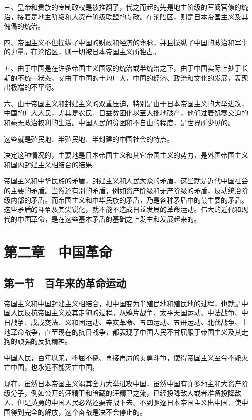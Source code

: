 三、皇帝和贵族的专制政权是被推翻了，代之而起的先是地主阶级的军阀官僚的统治，接着是地主阶级和大资产阶级联盟的专政。在沦陷区，则是日本帝国主义及其傀儡的统治。

四、帝国主义不但操纵了中国的财政和经济的命脉，并且操纵了中国的政治和军事的力量。在沦陷区，则一切被日本帝国主义所独占。

五、由于中国是在许多帝国主义国家的统治或半统治之下，由于中国实际上处于长期的不统一状态，又由于中国的土地广大，中国的经济、政治和文化的发展，表现出极端的不平衡。

六、由于帝国主义和封建主义的双重压迫，特别是由于日本帝国主义的大举进攻，中国的广大人民，尤其是农民，日益贫困化以至大批地破产，他们过着饥寒交迫的和毫无政治权利的生活。中国人民的贫困和不自由的程度，是世界所少见的。

这些就是殖民地、半殖民地、半封建的中国社会的特点。

决定这种情况的，主要地是日本帝国主义和其它帝国主义的势力，是外国帝国主义和国内封建主义相结合的结果。

帝国主义和中华民族的矛盾，封建主义和人民大众的矛盾，这些就是近代中国社会的主要的矛盾。当然还有别的矛盾，例如资产阶级和无产阶级的矛盾，反动统治阶级内部的矛盾。而帝国主义和中华民族的矛盾，乃是各种矛盾中的最主要的矛盾。这些矛盾的斗争及其尖锐化，就不能不造成日益发展的革命运动。伟大的近代和现代的中国革命，是在这些基本矛盾的基础之上发生和发展起来的。

\section{第二章　中国革命}

\subsection{第一节　百年来的革命运动}

帝国主义和中国封建主义相结合，把中国变为半殖民地和殖民地的过程，也就是中国人民反抗帝国主义及其走狗的过程。从鸦片战争、太平天国运动、中法战争、中日战争、戊戌变法、义和团运动、辛亥革命、五四运动、五卅运动、北伐战争、土地革命战争，直至现在的抗日战争，都表现了中国人民不甘屈服于帝国主义及其走狗的顽强的反抗精神。

中国人民，百年以来，不屈不挠、再接再厉的英勇斗争，使得帝国主义至今不能灭亡中国，也永远不能灭亡中国。

现在，虽然日本帝国主义竭其全力大举进攻中国，虽然中国有许多地主和大资产阶级分子，例如公开的汪精卫和暗藏的汪精卫之流，已经投降敌人或者准备投降敌人，但是英勇的中国人民必然还要奋战下去。不到驱逐日本帝国主义出中国，使中国得到完全的解放，这个奋战是决不会停止的。

